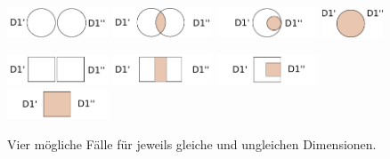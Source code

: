 \documentclass[11pt]{article}
\begin{document}
\begin{figure}[!htb]
    \centering
    \includegraphics[width=3cm]{CaseDifferentiation/GeneralCase_2EqualDim.pdf}
    \label{}
\endminipage\hfill
{}
    \centering
    \includegraphics[width=3cm]{CaseDifferentiation/GeneralCase_2EqualDim_ShareSomeDe.pdf}
    \label{}
\endminipage\hfill
{}%
    \centering
    \includegraphics[width=3cm]{CaseDifferentiation/GeneralCase_2EqualDim_DimInDim.pdf}
    \label{}
\endminipage
{}%
    \centering
    \includegraphics[width=1.8cm]{CaseDifferentiation/CaseDifferentiation_1SameDim_AllDePairPartnered.pdf}
    \label{}
\endminipage
\end{figure}

\begin{figure}[!htb]
    \centering
    \includegraphics[width=3cm]{CaseDifferentiation/GeneralCase_2UnequalDim.pdf}
    \label{}
\endminipage\hfill
{}
    \centering
    \includegraphics[width=3cm]{CaseDifferentiation/GeneralCase_2UnequalDim_ShareSomeDe.pdf}
    \label{}
\endminipage\hfill
{}%
    \centering
    \includegraphics[width=3cm]{CaseDifferentiation/GeneralCase_2UnequalDim_DimInDim.pdf}
    \label{}
\endminipage
{}%
    \centering
    \includegraphics[width=3cm]{CaseDifferentiation/GeneralCase_2UnequalDim_ShareAllDe.pdf}
    \label{}
\endminipage
    \caption{Vier mögliche Fälle für jeweils gleiche und ungleichen Dimensionen.}
    \label{fig:GeneralCases}
\end{figure}
\end{document}
